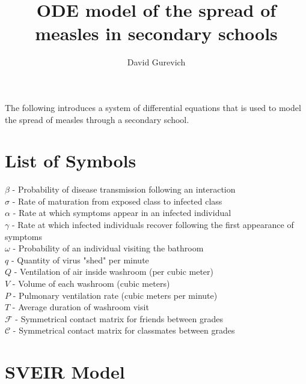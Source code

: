 \documentclass[fleqn]{article}
\title{ODE model of the spread of measles in secondary schools}
\author{David Gurevich}
\date{}
\begin{document}
\maketitle

The following introduces a system of differential equations that is used to model the spread of measles through a secondary school.

\section*{List of Symbols}

	$\beta$ - Probability of disease transmission following an interaction \\
	$\sigma$ - Rate of maturation from exposed class to infected class \\ 
	$\alpha$ - Rate at which symptoms appear in an infected individual \\
	$\gamma$ - Rate at which infected individuals recover following the first appearance of \indent symptoms \\
	$\omega$ - Probability of an individual visiting the bathroom \\
	$q$ - Quantity of virus "shed" per minute \\ 
	$Q$ - Ventilation of air inside washroom (per cubic meter) \\
	$V$ - Volume of each washroom (cubic meters) \\
	$P$ - Pulmonary ventilation rate (cubic meters per minute) \\
	$T$ - Average duration of washroom visit \\
	$\mathcal{F}$ - Symmetrical contact matrix for friends between grades \\
	$\mathcal{C}$ - Symmetrical contact matrix for classmates between grades \\

\newpage

\section*{SVEIR Model}
\end{document}
